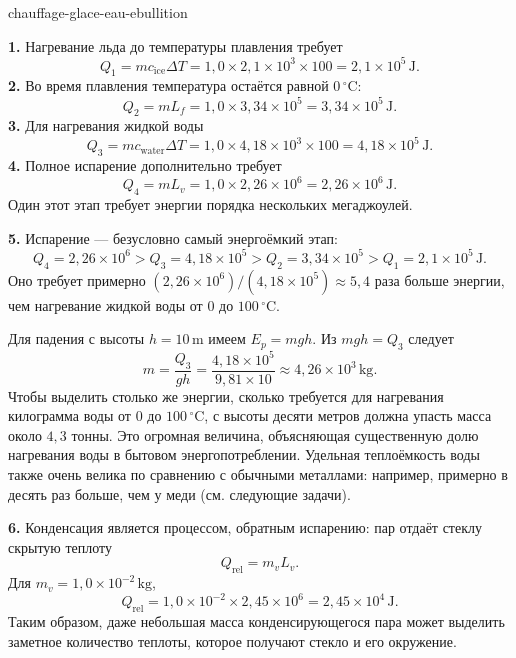 \begin{exo}{chauffage-glace-eau-ebullition}
\begin{solution}
\textbf{1.} Нагревание льда до температуры плавления требует
\[
Q_1=mc_{\text{ice}}\Delta T
=1{,}0\times2{,}1\times10^3\times100
=2{,}1\times10^5\,\text{J}.
\]
\textbf{2.} Во время плавления температура остаётся равной $0\,{}^\circ\text{C}$:
\[
Q_2=mL_f=1{,}0\times3{,}34\times10^5=3{,}34\times10^5\,\text{J}.
\]
\textbf{3.} Для нагревания жидкой воды
\[
Q_3=mc_{\text{water}}\Delta T
=1{,}0\times4{,}18\times10^3\times100
=4{,}18\times10^5\,\text{J}.
\]
\textbf{4.} Полное испарение дополнительно требует
\[
Q_4=mL_v=1{,}0\times2{,}26\times10^6=2{,}26\times10^6\,\text{J}.
\]
Один этот этап требует энергии порядка нескольких мегаджоулей.

\textbf{5.} Испарение — безусловно самый энергоёмкий этап:
\[
Q_4=2{,}26\times10^6>Q_3=4{,}18\times10^5>Q_2=3{,}34\times10^5>Q_1=2{,}1\times10^5\,\text{J}.
\]
Оно требует примерно $(2{,}26\times10^6)/(4{,}18\times10^5)\approx5{,}4$ раза больше энергии, чем нагревание жидкой воды от $0$ до $100\,{}^\circ\text{C}$.

Для падения с высоты $h=10\,\text{m}$ имеем $E_p=mgh$. Из $mgh=Q_3$ следует
\[
m=\frac{Q_3}{gh}=\frac{4{,}18\times10^5}{9{,}81\times10}
\approx4{,}26\times10^3\,\text{kg}.
\]
Чтобы выделить столько же энергии, сколько требуется для нагревания килограмма воды от $0$ до $100\,{}^\circ\text{C}$, с высоты десяти метров должна упасть масса около $4{,}3$ тонны. Это огромная величина, объясняющая существенную долю нагревания воды в бытовом энергопотреблении. Удельная теплоёмкость воды также очень велика по сравнению с обычными металлами: например, примерно в десять раз больше, чем у меди (см. следующие задачи).

\textbf{6.} Конденсация является процессом, обратным испарению: пар отдаёт стеклу скрытую теплоту
\[
Q_{\text{rel}}=m_vL_v.
\]
Для $m_v=1{,}0\times10^{-2}\,\text{kg}$,
\[
Q_{\text{rel}}=1{,}0\times10^{-2}\times2{,}45\times10^6
=2{,}45\times10^4\,\text{J}.
\]
Таким образом, даже небольшая масса конденсирующегося пара может выделить заметное количество теплоты, которое получают стекло и его окружение.
\end{solution}
\end{exo}

